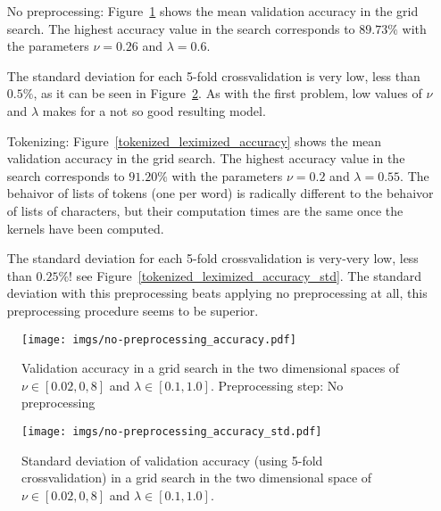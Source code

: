 \documentclass[format=acmtog]{acmart}
\begin{document}
\begin{itemize}
  \item[No preprocessing:] Figure~\ref{no-preprocessing_accuracy} shows the mean
  validation accuracy in the grid search. The highest accuracy value in the search
  corresponds to $89.73\%$ with the parameters $\nu = 0.26$ and $\lambda = 0.6$.

  The standard deviation for each 5-fold crossvalidation is very low, less than $0.5\%$, as
  it can be seen in Figure~\ref{no-preprocessing_accuracy_std}. As with the first problem,
  low values of $\nu$ and $\lambda$ makes for a not so good resulting model.


  \item[Tokenizing:] Figure~\ref{tokenized_leximized_accuracy} shows the mean
  validation accuracy in the grid search. The highest accuracy value in the search
  corresponds to $91.20\%$ with the parameters $\nu = 0.2$ and $\lambda = 0.55$. The
  behaivor of lists of tokens (one per word) is radically different to the behaivor of
  lists of characters, but their computation times are the same once the kernels have been
  computed.

  The standard deviation for each 5-fold crossvalidation is very-very low, less than
  $0.25\%$! see Figure~\ref{tokenized_leximized_accuracy_std}. The standard deviation with
  this preprocessing beats applying no preprocessing at all, this preprocessing procedure
  seems to be superior.
\end{itemize}

\begin{figure}
\centering
\texttt{[image: imgs/no-preprocessing\_accuracy.pdf]}
\caption{Validation accuracy in a grid search in the two dimensional
spaces of \(\nu \in [0.02,0,8]\) and \(\lambda \in [0.1, 1.0]\).
Preprocessing step: No preprocessing \label{no-preprocessing_accuracy}}
\end{figure}

\begin{figure}
\centering
\texttt{[image: imgs/no-preprocessing\_accuracy\_std.pdf]}
\caption{Standard deviation of validation accuracy (using 5-fold
crossvalidation) in a grid search in the two dimensional space of
\(\nu \in [0.02,0,8]\) and \(\lambda \in [0.1, 1.0]\).
\label{no-preprocessing_accuracy_std}}
\end{figure}
\end{document}
